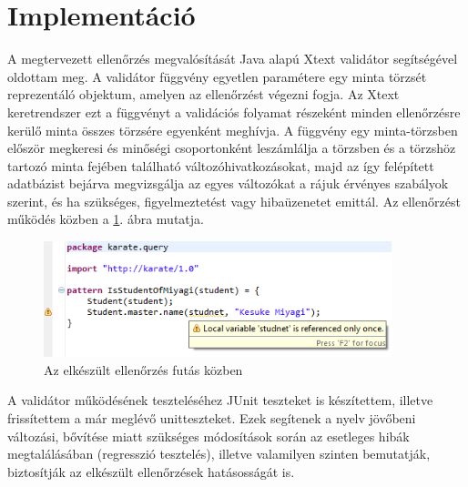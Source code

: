 
\section{Implementáció}

A megtervezett ellenőrzés megvalósítását Java alapú Xtext validátor segítségével oldottam meg.
A validátor függvény egyetlen paramétere egy minta törzsét reprezentáló objektum, amelyen az ellenőrzést végezni fogja.
Az Xtext keretrendszer ezt a függvényt a validációs folyamat részeként minden ellenőrzésre kerülő minta összes törzsére egyenként meghívja.
A függvény egy minta-törzsben először megkeresi és minőségi csoportonként leszámlálja a törzsben és a törzshöz tartozó minta fejében található változóhivatkozásokat, majd az így felépített adatbázist bejárva megvizsgálja az egyes változókat a rájuk érvényes szabályok szerint, és ha szükséges, figyelmeztetést vagy hibaüzenetet emittál.
Az ellenőrzést működés közben a \ref{fig:unusedLive}. ábra mutatja.
\begin{figure}[htb]
\centering
\includegraphics[width=0.90\textwidth]{figures/unused-variable-detection-warning.png}
\caption{Az elkészült ellenőrzés futás közben}
\label{fig:unusedLive}
\end{figure}

A validátor működésének teszteléséhez JUnit teszteket is készítettem, illetve frissítettem a már meglévő unitteszteket. Ezek segítenek a nyelv jövőbeni változási, bővítése miatt szükséges módosítások során az esetleges hibák megtalálásában (regresszió tesztelés), illetve valamilyen szinten bemutatják, biztosítják az elkészült ellenőrzések hatásosságát is.
